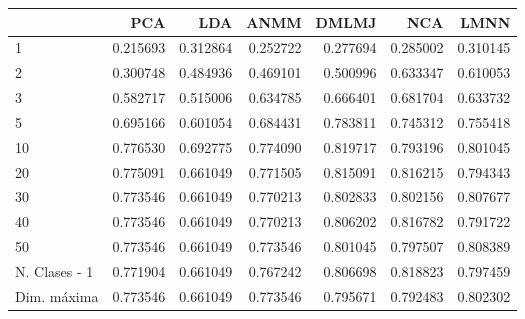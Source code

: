 \begin{tabular}{lrrrrrr}
\toprule
{} &       PCA &       LDA &      ANMM &     DMLMJ &       NCA &      LMNN \\
\midrule
1             &  0.215693 &  0.312864 &  0.252722 &  0.277694 &  0.285002 &  0.310145 \\
2             &  0.300748 &  0.484936 &  0.469101 &  0.500996 &  0.633347 &  0.610053 \\
3             &  0.582717 &  0.515006 &  0.634785 &  0.666401 &  0.681704 &  0.633732 \\
5             &  0.695166 &  0.601054 &  0.684431 &  0.783811 &  0.745312 &  0.755418 \\
10            &  0.776530 &  0.692775 &  0.774090 &  0.819717 &  0.793196 &  0.801045 \\
20            &  0.775091 &  0.661049 &  0.771505 &  0.815091 &  0.816215 &  0.794343 \\
30            &  0.773546 &  0.661049 &  0.770213 &  0.802833 &  0.802156 &  0.807677 \\
40            &  0.773546 &  0.661049 &  0.770213 &  0.806202 &  0.816782 &  0.791722 \\
50            &  0.773546 &  0.661049 &  0.773546 &  0.801045 &  0.797507 &  0.808389 \\
N. Clases - 1 &  0.771904 &  0.661049 &  0.767242 &  0.806698 &  0.818823 &  0.797459 \\
Dim. máxima   &  0.773546 &  0.661049 &  0.773546 &  0.795671 &  0.792483 &  0.802302 \\
\bottomrule
\end{tabular}
